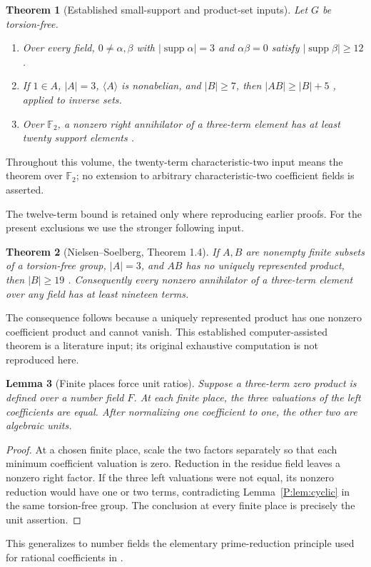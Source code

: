 \documentclass[11pt,a4paper,oneside]{report}
\newtheorem{theorem}{Theorem}[section]
\newtheorem{lemma}[theorem]{Lemma}
\theoremstyle{definition}
\theoremstyle{remark}
\DeclareMathOperator{\supp}{supp}
\begin{document}
\begin{theorem}[Established small-support and product-set inputs]
\label{P:thm:inputs}
Let $G$ be torsion-free.
\begin{enumerate}
\item Over every field, $0\ne\alpha,\beta$ with
$|\supp\alpha|=3$ and $\alpha\beta=0$ satisfy
$|\supp\beta|\ge12$ \cite[Corollary 1.3]{B:AJ}.
\item If $1\in A$, $|A|=3$, $\langle A\rangle$ is nonabelian,
and $|B|\ge7$, then $|AB|\ge|B|+5$
\cite[Theorem 1.2]{B:AJ}, applied to inverse sets.
\item Over $\mathbb F_2$, a nonzero right annihilator of a
three-term element has at least twenty support elements \cite{B:ATsmall}.
\end{enumerate}
\end{theorem}
Throughout this volume, the twenty-term characteristic-two input
means the theorem over $\mathbb F_2$; no extension to arbitrary
characteristic-two coefficient fields is asserted.

The twelve-term bound is retained only where reproducing earlier proofs.
For the present exclusions we use the stronger following input.
\begin{theorem}[Nielsen--Soelberg, Theorem 1.4]\label{P:next:NS}
If $A,B$ are nonempty finite subsets of a torsion-free group,
$|A|=3$, and $AB$ has no uniquely represented product, then
$|B|\ge19$ \cite{B:NS}. Consequently every nonzero annihilator
of a three-term element over any field has at least nineteen terms.
\end{theorem}
The consequence follows because a uniquely represented product
has one nonzero coefficient product and cannot vanish.
This established computer-assisted theorem is a literature input;
its original exhaustive computation is not reproduced here.

\begin{lemma}[Finite places force unit ratios]\label{P:lem:units}
Suppose a three-term zero product is defined over a number field
$F$. At each finite place, the three valuations of the left
coefficients are equal. After normalizing one coefficient to one,
the other two are algebraic units.
\end{lemma}
\begin{proof}
At a chosen finite place, scale the two factors separately so that
each minimum coefficient valuation is zero. Reduction in the residue
field leaves a nonzero right factor. If the three left valuations
were not equal, its nonzero reduction would have one or two terms,
contradicting Lemma~\ref{P:lem:cyclic} in the same torsion-free group.
The conclusion at every finite place is precisely the unit assertion.
\end{proof}
This generalizes to number fields the elementary prime-reduction
principle used for rational coefficients in \cite[Theorem 1.1]{B:ATrational}.
\end{document}
